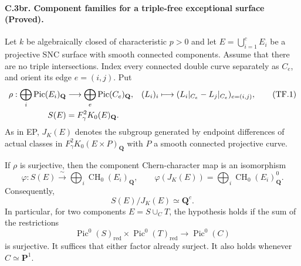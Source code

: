 \paragraph{C.3br. Component families for a triple-free exceptional surface
(Proved).}
Let $k$ be algebraically closed of characteristic $p>0$ and let
$E=\bigcup_{i=1}^cE_i$ be a projective SNC surface with smooth connected
components. Assume that there are no triple intersections.
Index every connected double curve separately as $C_e$, and orient its
edge $e=(i,j)$. Put
\begin{align}
 \rho:\bigoplus_i\operatorname{Pic}(E_i)_{\mathbf Q}
   &\longrightarrow\bigoplus_e\operatorname{Pic}(C_e)_{\mathbf Q},
 & (L_i)_i&\longmapsto
       (L_i|_{C_e}-L_j|_{C_e})_{e=(i,j)},                 \tag{TF.1}\\
 S(E)&=F_\gamma^2K_0(E)_{\mathbf Q}. \notag
\end{align}
As in EP, $J_K(E)$ denotes the subgroup generated by endpoint
differences of actual classes in $F_\gamma^2K_0(E\times P)_{\mathbf Q}$
with $P$ a smooth connected projective curve.

If $\rho$ is surjective, then the component Chern-character map is an
isomorphism
\begin{equation}
 \varphi:S(E)\xrightarrow{\ \sim\ }
                     \bigoplus_i\operatorname{CH}_0(E_i)_{\mathbf Q},
 \qquad
 \varphi(J_K(E))=\bigoplus_i\operatorname{CH}_0(E_i)^0_{\mathbf Q}.
                                                               \tag{TF.2}
\end{equation}
Consequently,
\begin{equation}
                       S(E)/J_K(E)\simeq\mathbf Q^c.     \tag{TF.3}
\end{equation}
In particular, for two components $E=S\cup_C T$, the hypothesis
holds if the sum of the restrictions
\begin{equation}
 \operatorname{Pic}^0(S)_{\mathrm{red}}\times
 \operatorname{Pic}^0(T)_{\mathrm{red}}\longrightarrow
                          \operatorname{Pic}^0(C)        \tag{TF.4}
\end{equation}
is surjective. It suffices that either factor already surject.
It also holds whenever $C\simeq\mathbf P^1$.

